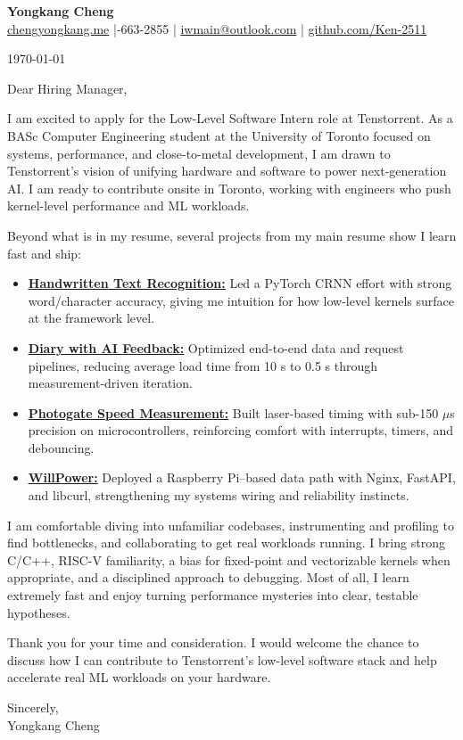 \documentclass[11pt]{article}
\begin{document}
{\Large \textbf{Yongkang Cheng}}\\[2pt]
\href{https://chengyongkang.me/}{chengyongkang.me} \;|-663-2855 \;|\; \href{mailto:iwmain@outlook.com}{iwmain@outlook.com} \;|\; \href{https://github.com/Ken-2511}{github.com/Ken-2511}

\today

\vspace{0.6em}
Dear Hiring Manager,

I am excited to apply for the Low-Level Software Intern role at Tenstorrent. As a BASc Computer Engineering student at the University of Toronto focused on systems, performance, and close-to-metal development, I am drawn to Tenstorrent’s vision of unifying hardware and software to power next-generation AI. I am ready to contribute onsite in Toronto, working with engineers who push kernel-level performance and ML workloads.

Beyond what is in my resume, several projects from my main resume show I learn fast and ship:
\begin{itemize}
    \item \textbf{\href{https://github.com/Ken-2511/HandwritingRecognition}{\underline{Handwritten Text Recognition:}}} Led a PyTorch CRNN effort with strong word/character accuracy, giving me intuition for how low-level kernels surface at the framework level.
    \item \textbf{\href{https://github.com/Ken-2511/Diary-with-ChatGPT-Comment}{\underline{Diary with AI Feedback:}}} Optimized end-to-end data and request pipelines, reducing average load time from 10 s to 0.5 s through measurement-driven iteration.
    \item \textbf{\href{https://github.com/Ken-2511/PhotogateSpeedMeasurement}{\underline{Photogate Speed Measurement:}}} Built laser-based timing with sub-150 $\mu$s precision on microcontrollers, reinforcing comfort with interrupts, timers, and debouncing.
    \item \textbf{\href{https://github.com/Ken-2511/WillPower}{\underline{WillPower:}}} Deployed a Raspberry Pi–based data path with Nginx, FastAPI, and libcurl, strengthening my systems wiring and reliability instincts.
\end{itemize}

I am comfortable diving into unfamiliar codebases, instrumenting and profiling to find bottlenecks, and collaborating to get real workloads running. I bring strong C/C++, RISC-V familiarity, a bias for fixed-point and vectorizable kernels when appropriate, and a disciplined approach to debugging. Most of all, I learn extremely fast and enjoy turning performance mysteries into clear, testable hypotheses.

Thank you for your time and consideration. I would welcome the chance to discuss how I can contribute to Tenstorrent’s low-level software stack and help accelerate real ML workloads on your hardware.

Sincerely,\\[1.0em]
Yongkang Cheng
\end{document}
